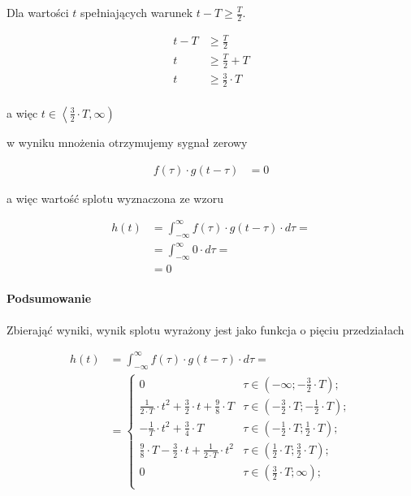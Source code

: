 \begin{task}
Dla wartości $t$ spełniających warunek $t-T \geq \frac{T}{2}$.

\begin{align*}
t-T& \geq \frac{T}{2}\\
t& \geq \frac{T}{2}+T\\
t& \geq \frac{3}{2}\cdot T\\
\end{align*}

a więc $t\in \left<\frac{3}{2}\cdot T, \infty \right)$

w wyniku mnożenia otrzymujemy sygnał zerowy

\begin{align*}
f(\tau) \cdot g(t-\tau)&=0
\end{align*}

a więc wartość splotu wyznaczona ze wzoru

\begin{align*}
h(t)&=\int_{-\infty}^{\infty} f(\tau) \cdot g(t-\tau) \cdot d\tau=\\
&=\int_{-\infty}^{\infty} 0 \cdot d\tau =\\
&=0
\end{align*}

\paragraph{Podsumowanie}

Zbierająć wyniki, wynik splotu wyrażony jest jako funkcja o pięciu przedziałach

\begin{align*}
h(t)&=\int_{-\infty}^{\infty} f(\tau) \cdot g(t-\tau) \cdot d\tau=\\
&=\begin{cases}
0 & \tau \in \left(-\infty; -\frac{3}{2}\cdot T\right);\\
\frac{1}{2\cdot T} \cdot t^2 + \frac{3}{2} \cdot t+\frac{9}{8} \cdot  T & \tau \in \left( -\frac{3}{2}\cdot T; -\frac{1}{2} \cdot T\right);\\
- \frac{1}{T}\cdot t^2 + \frac{3}{4} \cdot T & \tau \in \left( -\frac{1}{2}\cdot T; \frac{1}{2} \cdot T\right);\\
\frac{9}{8}\cdot T - \frac{3}{2} \cdot t  +  \frac{1}{2 \cdot T} \cdot t^2 & \tau \in \left( \frac{1}{2}\cdot T; \frac{3}{2} \cdot T\right);\\
0 & \tau \in \left(\frac{3}{2}\cdot T ; \infty\right);\\
\end{cases}
\end{align*}


\end{task}
